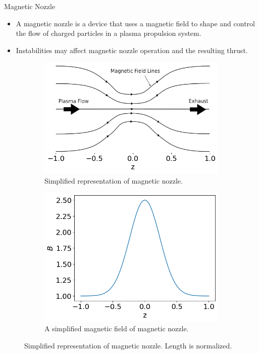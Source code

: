 \begin{frame}{Magnetic Nozzle}
  \begin{itemize}
    \item A magnetic nozzle is a device that uses a magnetic field to shape and control the flow of charged particles in a plasma propulsion system.
    \item Instabilities may affect magnetic nozzle operation and the resulting thrust. \cite{kaganovich_2020_physics}
  \end{itemize}
  \begin{figure}[htbp]
    \centering
    \begin{subfigure}{0.45\textwidth}
      \centering
      \includegraphics[width=0.8\linewidth]{figures/magnetic-nozzle}
      \caption{Simplified representation of magnetic nozzle.}
    \end{subfigure}%
    \begin{subfigure}{0.45\textwidth}
      \centering
      \includegraphics[width=0.8\linewidth]{figures/magnetic-field}
      \caption{A simplified magnetic field of magnetic nozzle.}
    \end{subfigure}
    \caption{Simplified representation of magnetic nozzle. Length is normalized.}
    \label{fig:magnetic-nozzle}
  \end{figure}
\end{frame}

